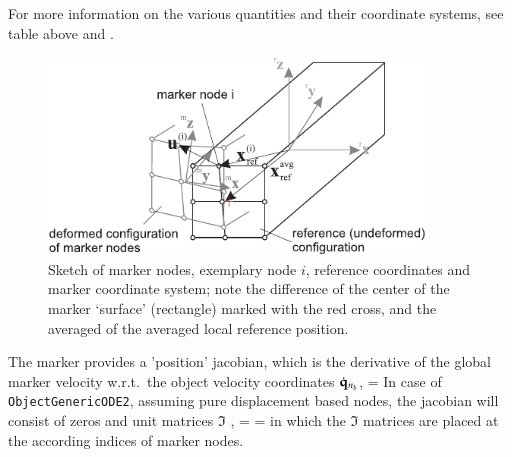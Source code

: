     For more information on the various quantities and their coordinate systems, see table above and .
    \begin{figure}[tbph]
      \begin{center}
      \includegraphics[width=10cm]{figures/MarkerSuperElementRigid.pdf}
      \end{center}
      \caption{Sketch of marker nodes, exemplary node $i$, reference coordinates and marker coordinate system; 
               note the difference of the center of the marker `surface' (rectangle) marked with the red cross, 
               and the averaged of the averaged local reference position.}
    	\label{fig:MarkerSuperElementRigid:sketch}
    \end{figure}
    The marker provides a 'position' jacobian, which is the derivative of the global marker velocity w.r.t.\ the 
    object velocity coordinates $\dot {\mathbf{q}}_{n_b}$,
    \be
       =  \eqDot
    \ee
    In case of \texttt{ObjectGenericODE2}, assuming pure displacement based nodes,
    the jacobian will consist of zeros and unit matrices $\Im$ ,
    \be
       =  
      = \left[ \Null,\; \ldots,\; \Null,\; \Im,\; \Null,\; \ldots,\; \Null,\; \Im,\; \Null,\; \ldots,\; \Null \right]\eqComma
    \ee
    in which the $\Im$ matrices are placed at the according indices of marker nodes.

